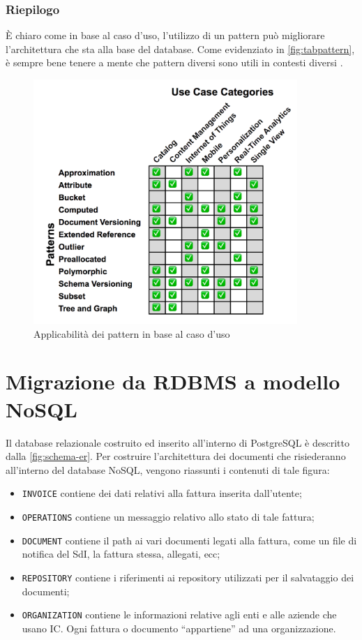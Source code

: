 \subsubsection{Riepilogo}
È chiaro come in base al caso d'uso, l'utilizzo di un pattern può migliorare l'architettura che sta alla base del database. Come evidenziato in \autoref{fig:tabpattern}, è sempre bene tenere a mente che pattern diversi sono utili in contesti diversi \cite{site:mongoDataModeling}.

\begin{figure}[htbp]
\begin{center}
\includegraphics[height=25em]{immagini/patterns-table.png}
\caption{Applicabilità dei pattern in base al caso d'uso \cite{site:mongoDataModeling}}
\label{fig:tabpattern}
\end{center}
\end{figure}

\section{Migrazione da RDBMS a modello NoSQL}
Il database relazionale costruito ed inserito all'interno di PostgreSQL è descritto dalla \autoref{fig:schema-er}. Per costruire l'architettura dei documenti che risiederanno all'interno del database NoSQL, vengono riassunti i contenuti di tale figura:\\
\begin{itemize}
    \item \texttt{INVOICE} contiene dei dati relativi alla fattura inserita dall'utente;
    \item \texttt{OPERATIONS} contiene un messaggio relativo allo stato di tale fattura;
    \item \texttt{DOCUMENT} contiene il path ai vari documenti legati alla fattura, come un file di notifica del SdI, la fattura stessa, allegati, ecc;
    \item \texttt{REPOSITORY} contiene i riferimenti ai repository utilizzati per il salvataggio dei documenti;
    \item \texttt{ORGANIZATION} contiene le informazioni relative agli enti e alle aziende che usano IC. Ogni fattura o documento ``appartiene'' ad una organizzazione.
\end{itemize}

